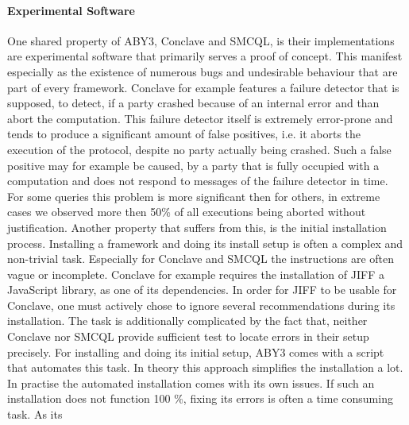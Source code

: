 \paragraph{Experimental Software}
One shared property of ABY3, Conclave and SMCQL, is their implementations are experimental software that primarily serves a proof of concept. This manifest especially as the existence of numerous bugs and undesirable behaviour that are part of every framework. Conclave for example features a failure detector that is supposed, to detect, if a party crashed because of an  internal error and than abort the computation. This failure detector itself is extremely error-prone and tends to produce a significant amount of false positives, i.e. it aborts the execution of the protocol, despite no party actually being crashed. Such a false positive may for example be caused, by a party that is fully occupied with a computation and does not respond to messages of the failure detector in time. For some queries this problem is more significant then for others, in extreme cases we observed more then 50\% of all executions being aborted without justification. %
Another property that suffers from this, is the initial installation process. Installing a framework and doing its install setup is often a complex and non-trivial task. Especially for Conclave and SMCQL the instructions are often vague or incomplete. Conclave for example requires the installation of JIFF \cite{JIFF} a JavaScript library, as one of its dependencies. In order for JIFF to be usable for Conclave, one must actively chose to ignore several recommendations during its installation. The task is additionally complicated by the fact that, neither Conclave nor SMCQL provide sufficient test to locate errors in their setup precisely. For installing and doing its initial setup, ABY3 comes with a script that automates this task. In theory this approach simplifies the installation a lot. In practise the automated installation comes with its own issues. If such an installation does not function 100 \%, fixing its errors is often a time consuming task. As its 


